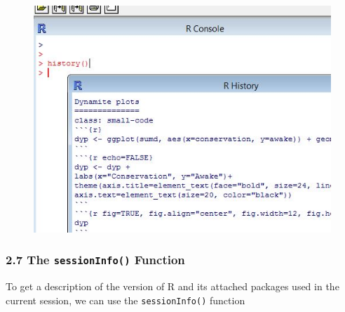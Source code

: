 \documentclass{beamer}
\begin{document}
 	\begin{frame}
 		\begin{figure}
 			\centering
 			\includegraphics[width=1.2\linewidth]{images/Rhistory}        
 		\end{figure}
 	\end{frame}   
 	\begin{frame}
 		\frametitle{2.7 The \texttt{sessionInfo()} Function}
 		To get a description of the version of R and its attached packages used in the current session,
 		we can use the \texttt{sessionInfo()} function
 		
 	\end{frame}
 	
\end{document}
